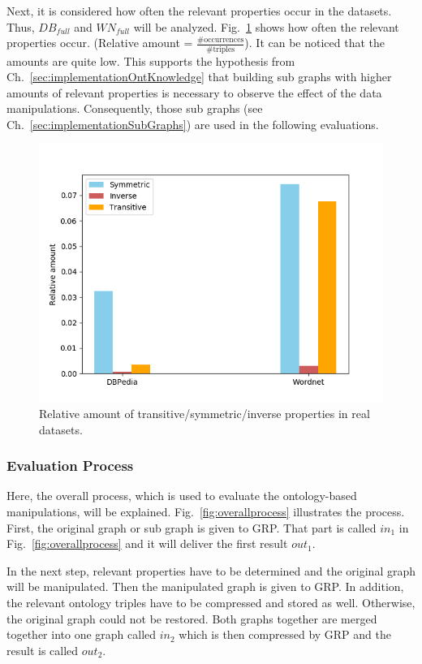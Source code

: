 Next, it is considered how often the relevant properties occur in the datasets.  Thus, $DB_{full}$ and $WN_{full}$ will be analyzed. Fig.~\ref{fig:ontoccurrences} shows how often the relevant properties occur. (Relative amount = $\frac{\text{\#occurrences}}{\text{\#triples}}$). It can be noticed that the amounts are quite low. This supports the hypothesis from Ch.~\ref{sec:implementationOntKnowledge} that building sub graphs with higher amounts of relevant properties is necessary to observe the effect of the data manipulations. Consequently, those sub graphs (see Ch.~\ref{sec:implementationSubGraphs}) are used in the following evaluations.

\begin{figure}
	\centering
	\includegraphics[width=0.8\linewidth]{figures/4_evaluation/ontOccurrences}
	\caption{Relative amount of transitive/symmetric/inverse properties in real datasets.}
	\label{fig:ontoccurrences}
\end{figure}






\subsubsection{Evaluation Process}
Here, the overall process, which is used to evaluate the ontology-based manipulations, will be explained. Fig.~\ref{fig:overallprocess} illustrates the process. First, the original graph or sub graph is given to GRP. That part is called $in_1$ in Fig.~\ref{fig:overallprocess} and it will deliver the first result $out_1$.

In the next step, relevant properties have to be determined and the original graph will be manipulated. Then the manipulated graph is given to GRP. In addition, the relevant ontology triples have to be compressed and stored as well. Otherwise, the original graph could not be restored. Both graphs together are merged together into one graph called $in_2$ which is then compressed by GRP and the result is called $out_2$. 

